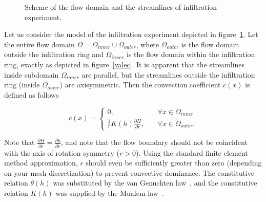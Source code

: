 \documentclass[review]{myarticle}
\newenvironment{lineq}
    {\begin{linenomath*}
    \begin{equation}
    }
    { 
    \end{equation} 
    \end{linenomath*}
    }
\begin{document}
 \begin{figure}
\centering
{}
 \caption{Scheme of the flow domain and the streamlines of infiltration experiment. }
 \label{valecproudy}
\end{figure}

Let us consider the model of the infiltration experiment depicted in figure~\ref{valecproudy}. Let the entire flow domain $\Omega=\Omega_{inner} \cup \Omega_{outer}$, where $\Omega_{outer}$ is the flow domain outside the infiltration ring and $\Omega_{inner}$ is the flow domain within the infiltration ring, exactly as depicted in figure~\ref{valec}. It is apparent that the streamlines inside subdomain $\Omega_{inner}$ are parallel, but the streamlines outside the infiltration ring (inside $\Omega_{outer}$) are axisymmetric.  Then the convection coefficient $c(x)$ is defined as follows
\begin{lineq}
\label{convect}
c(x) = \begin{cases}
	     0 , \quad &\forall x \in \Omega_{inner} \\
	     \frac{1}{r}K(h)\frac{\partial H}{\partial r} , \quad &\forall x \in \Omega_{outer}.
	    \end{cases}
\end{lineq}
Note that $\frac{\partial H}{\partial r} = \frac{\partial h}{\partial r}$, and note that  the flow boundary should not be coincident with the axis of rotation symmetry ($r>0$). Using the standard finite element method approximation, $r$ should even be sufficiently greater than zero (depending on your mesh discretization) to prevent convective dominance. The constitutive relation $\theta(h)$ was substituted by the van Genuchten law~\citep{vangenuchten}, and the constitutive relation $K(h)$ was supplied by the Mualem law~\citep{mualem}.
\end{document}
